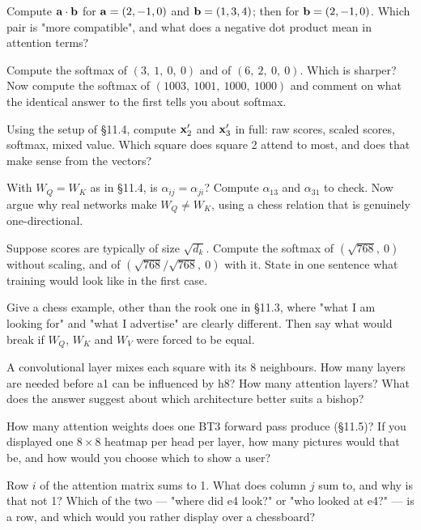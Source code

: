 \begin{exercises}

 Compute $\mathbf{a}\cdot\mathbf{b}$ for $\mathbf{a} = (2,-1,0)$ and
$\mathbf{b} = (1,3,4)$; then for $\mathbf{b} = (2,-1,0)$. Which pair is "more compatible", and what
does a negative dot product mean in attention terms?

 Compute the softmax of $(3,\ 1,\ 0,\ 0)$ and of
$(6,\ 2,\ 0,\ 0)$. Which is sharper? Now compute the softmax of $(1003,\ 1001,\ 1000,\ 1000)$
and comment on what the identical answer to the first tells you about softmax.

 Using the setup of §11.4, compute $\mathbf{x}_2'$ and
$\mathbf{x}_3'$ in full: raw scores, scaled scores, softmax, mixed value. Which square does
square 2 attend to most, and does that make sense from the vectors?

 With $W_Q = W_K$ as in §11.4, is $\alpha_{ij} = \alpha_{ji}$?
Compute $\alpha_{13}$ and $\alpha_{31}$ to check. Now argue why real networks make
$W_Q \neq W_K$, using a chess relation that is genuinely one-directional.

 Suppose scores are typically of size $\sqrt{d_k}$. Compute
the softmax of $(\sqrt{768},\ 0)$ without scaling, and of $(\sqrt{768}/\sqrt{768},\ 0)$ with
it. State in one sentence what training would look like in the first case.

 Give a chess example, other than the rook one in
§11.3, where "what I am looking for" and "what I advertise" are clearly different. Then say
what would break if $W_Q$, $W_K$ and $W_V$ were forced to be equal.

 A convolutional layer mixes each square with its
8 neighbours. How many layers are needed before a1 can be influenced by h8? How many
attention layers? What does the answer suggest about which architecture better suits a
bishop?

 How many attention weights does one BT3 forward pass produce
(§11.5)? If you displayed one $8\times8$ heatmap per head per layer, how many pictures would
that be, and how would you choose which to show a user?

 Row $i$ of the attention matrix sums to 1. What does
column $j$ sum to, and why is that not 1? Which of the two --- "where did e4 look?" or "who
looked at e4?" --- is a row, and which would you rather display over a chessboard?


\end{exercises}
